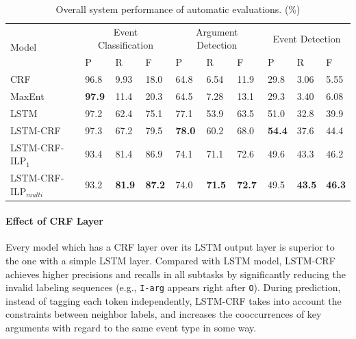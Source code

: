 \begin{table}[!t]
\centering
\small
\begin{tabular}{|l|p{0.8cm}<{\centering}|p{0.8cm}<{\centering}|p{0.8cm}<{\centering}|p{0.8cm}<{\centering}|p{0.8cm}<{\centering}|p{0.8cm}<{\centering}|p{0.8cm}<{\centering}|p{0.8cm}<{\centering}|p{0.8cm}<{\centering}|} \hline
	\multirow{2}{*}{Model} & \multicolumn{3}{c|}{Event Classification} & \multicolumn{3}{c|}{Argument Detection} &
	\multicolumn{3}{c|}{Event Detection} \\ \cline{2-10}
	 & P & R & F & P & R & F & P & R & F \\ \hline
	CRF & 96.8 & 9.93 & 18.0 & 64.8 & 6.54 & 11.9 & 29.8 & 3.06 & 5.55 \\ \hline
	MaxEnt & \textbf{97.9} & 11.4 & 20.3 & 64.5 & 7.28 & 13.1 & 29.3 & 3.40 & 6.08 \\ \hline
	LSTM & 97.2 & 62.4 & 75.1 & 77.1 & 53.9 & 63.5 & 51.0 & 32.8 & 39.9  \\ \hline \hline
	LSTM-CRF & 97.3 & 67.2 & 79.5 & \textbf{78.0} & 60.2 & 68.0  & \textbf{54.4} & 37.6 & 44.4  \\ \hline
	LSTM-CRF-ILP$_{1}$ & 93.4 & 81.4 & 86.9 & 74.1 & 71.1 & 72.6  & 49.6 & 43.3 & 46.2 \\ \hline
	LSTM-CRF-ILP$_{multi}$ & 93.2 & \textbf{81.9} & \textbf{87.2} &  74.0 & \textbf{71.5} & \textbf{72.7} & 49.5 & \textbf{43.5} & \textbf{46.3} \\ \hline
\end{tabular}
\caption{Overall system performance of automatic evaluations. (\%) \label{tab:1}}
\end{table}


\paragraph{Effect of CRF Layer} 
Every model which has a CRF layer over its LSTM output layer is superior to the one with a simple LSTM layer. Compared with LSTM model, LSTM-CRF achieves higher precisions and recalls in all subtasks by significantly reducing the invalid labeling sequences (e.g., \texttt{I-arg} appears right after \texttt{O}). During prediction, instead of tagging each token independently, LSTM-CRF takes into account the constraints between neighbor labels, and increases the cooccurrences of key arguments with regard to the same event type in some way. 

